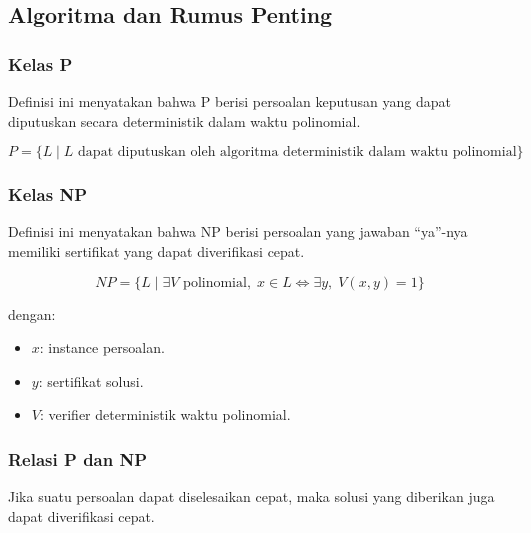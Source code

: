 \subsection{Algoritma dan Rumus Penting}

\subsubsection{Kelas P}

\begin{jawab}
Definisi ini menyatakan bahwa P berisi persoalan keputusan yang dapat diputuskan secara deterministik dalam waktu polinomial.
\end{jawab}

\begin{equation}
    P=\{L \mid L \text{ dapat diputuskan oleh algoritma deterministik dalam waktu polinomial}\}
    \label{eq:class-p}
\end{equation}

\subsubsection{Kelas NP}

\begin{jawab}
Definisi ini menyatakan bahwa NP berisi persoalan yang jawaban ``ya''-nya memiliki sertifikat yang dapat diverifikasi cepat.
\end{jawab}

\begin{equation}
    NP=\{L \mid \exists V \text{ polinomial},\; x\in L \iff \exists y,\; V(x,y)=1\}
    \label{eq:class-np}
\end{equation}

dengan:
\begin{itemize}
    \item $x$: instance persoalan.
    \item $y$: sertifikat solusi.
    \item $V$: verifier deterministik waktu polinomial.
\end{itemize}

\subsubsection{Relasi P dan NP}

\begin{jawab}
Jika suatu persoalan dapat diselesaikan cepat, maka solusi yang diberikan juga dapat diverifikasi cepat.
\end{jawab}

